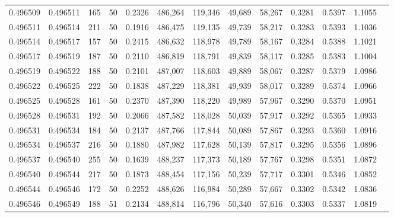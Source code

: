 \begin{tabular}{rrrrrrrrrrrrr}
0.496509 & 0.496511 &   165 &  50 &                                     0.2326 & 486,264 & 119,346 &  49,689 &  58,267 & 0.3281 & 0.5397 & 1.1055 \\
0.496511 & 0.496514 &   211 &  50 &                                     0.1916 & 486,475 & 119,135 &  49,739 &  58,217 & 0.3283 & 0.5393 & 1.1036 \\
0.496514 & 0.496517 &   157 &  50 &                                     0.2415 & 486,632 & 118,978 &  49,789 &  58,167 & 0.3284 & 0.5388 & 1.1021 \\
0.496517 & 0.496519 &   187 &  50 &                                     0.2110 & 486,819 & 118,791 &  49,839 &  58,117 & 0.3285 & 0.5383 & 1.1004 \\
0.496519 & 0.496522 &   188 &  50 &                                     0.2101 & 487,007 & 118,603 &  49,889 &  58,067 & 0.3287 & 0.5379 & 1.0986 \\
0.496522 & 0.496525 &   222 &  50 &                                     0.1838 & 487,229 & 118,381 &  49,939 &  58,017 & 0.3289 & 0.5374 & 1.0966 \\
0.496525 & 0.496528 &   161 &  50 &                                     0.2370 & 487,390 & 118,220 &  49,989 &  57,967 & 0.3290 & 0.5370 & 1.0951 \\
0.496528 & 0.496531 &   192 &  50 &                                     0.2066 & 487,582 & 118,028 &  50,039 &  57,917 & 0.3292 & 0.5365 & 1.0933 \\
0.496531 & 0.496534 &   184 &  50 &                                     0.2137 & 487,766 & 117,844 &  50,089 &  57,867 & 0.3293 & 0.5360 & 1.0916 \\
0.496534 & 0.496537 &   216 &  50 &                                     0.1880 & 487,982 & 117,628 &  50,139 &  57,817 & 0.3295 & 0.5356 & 1.0896 \\
0.496537 & 0.496540 &   255 &  50 &                                     0.1639 & 488,237 & 117,373 &  50,189 &  57,767 & 0.3298 & 0.5351 & 1.0872 \\
0.496540 & 0.496544 &   217 &  50 &                                     0.1873 & 488,454 & 117,156 &  50,239 &  57,717 & 0.3301 & 0.5346 & 1.0852 \\
0.496544 & 0.496546 &   172 &  50 &                                     0.2252 & 488,626 & 116,984 &  50,289 &  57,667 & 0.3302 & 0.5342 & 1.0836 \\
0.496546 & 0.496549 &   188 &  51 &                                     0.2134 & 488,814 & 116,796 &  50,340 &  57,616 & 0.3303 & 0.5337 & 1.0819 \\

\end{tabular}
